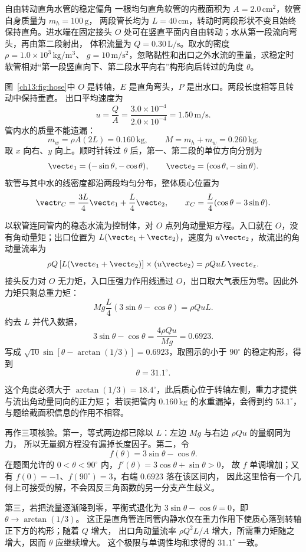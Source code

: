 \begin{origexamplebox}{自由转动直角水管的稳定偏角}\label{ch13:ex:hose}
一根均匀直角软管的内截面积为 $A=2.0\,\mathrm{cm^2}$，软管自身质量为 $m_h=100\,\mathrm g$，
两段管长均为 $L=40\,\mathrm{cm}$，转动时两段形状不变且始终保持直角。进水端在固定接头 $O$ 处可在竖直平面内自由转动；水从第一段流向弯头，再由第二段射出，
体积流量为 $Q=0.30\,\mathrm{L/s}$。取水的密度 $\rho=1.0\times10^3\,\mathrm{kg/m^3}$、
$g=10\,\mathrm{m/s^2}$，忽略黏性和出口之外水流的重量，求稳定时软管相对“第一段竖直向下、第二段水平向右”构形向后转过的角度 $\theta$。

\FluidHoseDiagram
\end{origexamplebox}
\begin{xesolution}
图~\ref{ch13:fig:hose}中 $O$ 是转轴，$E$ 是直角弯头，$P$ 是出水口。两段长度相等且转动中保持垂直。
出口平均速度为
\[
 u=\frac QA=\frac{3.0\times10^{-4}}{2.0\times10^{-4}}
 =1.50\,\mathrm{m/s}.
\]
管内水的质量不能遗漏：
\[
 m_w=\rho A(2L)=0.160\,\mathrm{kg},\qquad
 M=m_h+m_w=0.260\,\mathrm{kg}.
\]
取 $x$ 向右、$y$ 向上。顺时针转过 $\theta$ 后，第一、第二段的单位方向分别为
\[
 \vect e_1=(-\sin\theta,-\cos\theta),\qquad
 \vect e_2=(\cos\theta,-\sin\theta).
\]
软管与其中水的线密度都沿两段均匀分布，整体质心位置为
\[
 \vect r_C=\frac{3L}{4}\vect e_1+\frac L4\vect e_2,\qquad
 x_C=\frac L4(\cos\theta-3\sin\theta).
\]

以软管连同管内的稳态水流为控制体，对 $O$ 点列角动量矩方程。入口就在 $O$，没有角动量矩；出口位置为
$L(\vect e_1+\vect e_2)$，速度为 $u\vect e_2$，故流出的角动量流率为
\[
 \rho Q\,[L(\vect e_1+\vect e_2)]\times(u\vect e_2)
 =\rho QuL\,\vect e_z.
\]
接头反力对 $O$ 无力矩，入口压强力作用线通过 $O$，出口取大气表压为零。因此外力矩只剩总重力矩：
\[
 Mg\frac L4(3\sin\theta-\cos\theta)=\rho QuL.
\]
约去 $L$ 并代入数据，
\[
 3\sin\theta-\cos\theta
 =\frac{4\rho Qu}{Mg}=0.6923.
\]
写成
$\sqrt{10}\sin[\theta-\arctan(1/3)]=0.6923$，取图示的小于 $90^\circ$ 的稳定构形，得到
\[
 \boxed{\theta=31.1^\circ}.
\]
\FluidHoseAnalysisDiagram

这个角度必须大于 $\arctan(1/3)=18.4^\circ$，此后质心位于转轴左侧，重力才提供与流出角动量同向的正力矩；
若误把管内 $0.160\,\mathrm{kg}$ 的水重漏掉，会得到约 $53.1^\circ$，与题给截面积信息的作用不相容。

再作三项核验。第一，等式两边都已除以 $L$：左边 $Mg$ 与右边 $\rho Qu$ 的量纲同为力，
所以无量纲方程没有漏掉长度因子。第二，令
\[
 f(\theta)=3\sin\theta-\cos\theta.
\]
在题图允许的 $0<\theta<90^\circ$ 内，$f'(\theta)=3\cos\theta+\sin\theta>0$，
故 $f$ 单调增加；又有 $f(0)=-1$、$f(90^\circ)=3$，右端 $0.6923$ 落在该区间内，
因此这里恰有一个几何上可接受的解，不会因反三角函数的另一分支产生歧义。

第三，若把流量逐渐降到零，平衡式退化为
$3\sin\theta-\cos\theta=0$，即 $\theta\to\arctan(1/3)$。
这正是直角管连同管内静水仅在重力作用下使质心落到转轴正下方的构形；随着 $Q$ 增大，
出口角动量流率 $\rho Q^2L/A$ 增大，所需重力矩随之增大，因而 $\theta$ 应继续增大。
这个极限与单调性均和求得的 $31.1^\circ$ 一致。
\end{xesolution}
